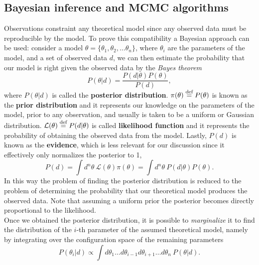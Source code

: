 \subsection{Bayesian inference and MCMC algorithms}
Observations constraint any theoretical model since any observed data must be reproducible by the model. To prove this compatibility a Bayesian approach can be used: consider a model $\theta=\{\theta_1,\theta_2,\dots\theta_n\}$, where $\theta_i$ are the parameters of the model, and a set of observed data $d$, we can then estimate the probability that our model is right given the observed data by the \emph{Bayes theorem}
\begin{equation}
    P(\theta|d)=\frac{P(d|\theta)P(\theta)}{P(d)},
\end{equation}
where $P(\theta|d)$ is called the \textbf{posterior distribution}. $\pi(\theta)\stackrel{\text{def}}{=} P(\theta)$ is known as the \textbf{prior distribution} and it represents our knowledge on the parameters of the model, prior to any observation, and usually is taken to be a uniform or Gaussian distribution.  $\mathcal{L}(\theta)\stackrel{\text{def}}{=} P(d|\theta)$ is called \textbf{likelihood function} and it represents the probability of obtaining the observed data from the model. Lastly, $P(d)$ is known as the \textbf{evidence}, which is less relevant for our discussion since it effectively only normalizes the posterior to 1, 
$$P(d)=\int d^n\theta\ \mathcal{L}(\theta)\pi(\theta)=\int d^n\theta\ P(d|\theta)P(\theta).$$
In this way the problem of finding the posterior distribution is reduced to the problem of determining the probability that our theoretical model produces the observed data. Note that assuming a uniform prior the posterior becomes directly proportional to the likelihood.\\ 
Once we obtained the posterior distribution, it is possible to \emph{marginalize} it to find the distribution of the $i$-th parameter of the assumed theoretical model, namely by integrating over the configuration space of the remaining parameters
$$P(\theta_i|d)\propto\int d\theta_1\dots d\theta_{i-1}d\theta_{i+1}\dots d\theta_n\ P(\theta|d). $$


